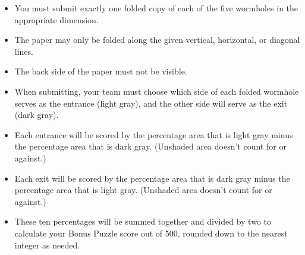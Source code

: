\begin{itemize}
  \item You must submit exactly one folded copy of each of the 
    five wormholes in the appropriate dimension.
  \item The paper may only be folded along the given vertical,
    horizontal, or diagonal lines.
  \item The back side of the paper must not be visible.
  \item When submitting, your team must choose which side of each 
    folded wormhole serves as the entrance (light gray),
    and the other side will serve as the exit (dark gray).
  \item Each entrance will be scored by the percentage area that
    is light gray minus the percentage area that is dark gray.
    (Unshaded area doesn't count for or against.)
  \item Each exit will be scored by the percentage area that
    is dark gray minus the percentage area that is light gray.
    (Unshaded area doesn't count for or against.)
  \item These ten percentages will be summed together and divided 
    by two to calculate your Bonus Puzzle score out of 500, 
    rounded down to the nearest integer as needed.
\end{itemize}
